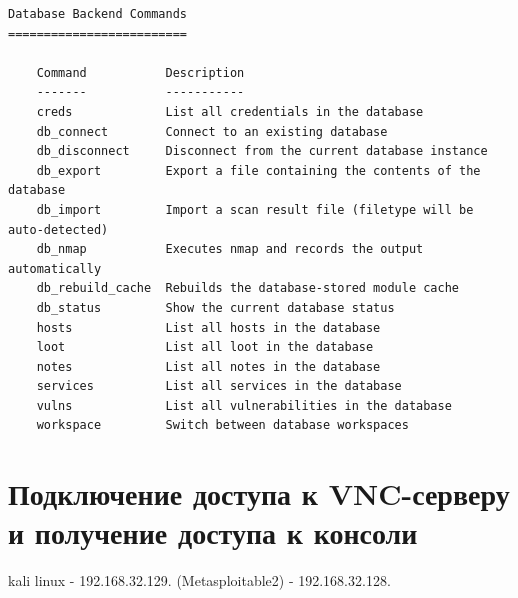 \documentclass[10pt,a4paper]{report}
\begin{document}
\begin{lstlisting}
Database Backend Commands
=========================

    Command           Description
    -------           -----------
    creds             List all credentials in the database
    db_connect        Connect to an existing database
    db_disconnect     Disconnect from the current database instance
    db_export         Export a file containing the contents of the database
    db_import         Import a scan result file (filetype will be auto-detected)
    db_nmap           Executes nmap and records the output automatically
    db_rebuild_cache  Rebuilds the database-stored module cache
    db_status         Show the current database status
    hosts             List all hosts in the database
    loot              List all loot in the database
    notes             List all notes in the database
    services          List all services in the database
    vulns             List all vulnerabilities in the database
    workspace         Switch between database workspaces

		\end{lstlisting}
	
	\section{Подключение доступа к VNC-серверу и получение доступа к консоли}
		kali linux - 192.168.32.129. 
		(Metasploitable2) - 192.168.32.128.
		
\end{document}

